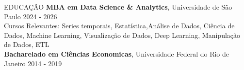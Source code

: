 \documentclass{resume} %
\begin{document}






\begin{rSection}{EDUCAÇÃO}
{\bf MBA em Data Science \& Analytics}, Universidade de São Paulo \hfill {2024 - 2026}\\
{\small Cursos Relevantes: Series temporais, Estatística,Análise de Dados, Ciência de Dados, Machine Learning, Visualização de Dados, Deep Learning, Manipulação de Dados, ETL} \\

\vspace{-1.25em}
{\bf Bacharelado em Ciências Economicas}, Universidade Federal do Rio de Janeiro \hfill {2014 - 2019} \\
\end{rSection}
\end{document}
